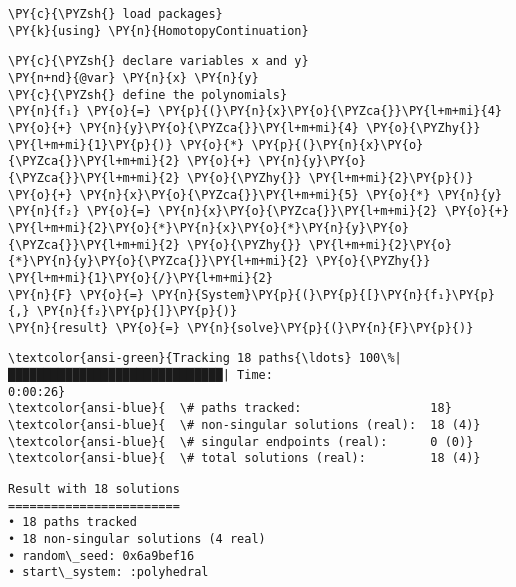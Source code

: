     \begin{tcolorbox}[breakable, size=fbox, boxrule=1pt, pad at break*=1mm,colback=cellbackground, colframe=cellborder]
\begin{Verbatim}[commandchars=\\\{\}]
\PY{c}{\PYZsh{} load packages}
\PY{k}{using} \PY{n}{HomotopyContinuation}
\end{Verbatim}
\end{tcolorbox}

    \begin{tcolorbox}[breakable, size=fbox, boxrule=1pt, pad at break*=1mm,colback=cellbackground, colframe=cellborder]
\begin{Verbatim}[commandchars=\\\{\}]
\PY{c}{\PYZsh{} declare variables x and y}
\PY{n+nd}{@var} \PY{n}{x} \PY{n}{y}
\PY{c}{\PYZsh{} define the polynomials}
\PY{n}{f₁} \PY{o}{=} \PY{p}{(}\PY{n}{x}\PY{o}{\PYZca{}}\PY{l+m+mi}{4} \PY{o}{+} \PY{n}{y}\PY{o}{\PYZca{}}\PY{l+m+mi}{4} \PY{o}{\PYZhy{}} \PY{l+m+mi}{1}\PY{p}{)} \PY{o}{*} \PY{p}{(}\PY{n}{x}\PY{o}{\PYZca{}}\PY{l+m+mi}{2} \PY{o}{+} \PY{n}{y}\PY{o}{\PYZca{}}\PY{l+m+mi}{2} \PY{o}{\PYZhy{}} \PY{l+m+mi}{2}\PY{p}{)} \PY{o}{+} \PY{n}{x}\PY{o}{\PYZca{}}\PY{l+m+mi}{5} \PY{o}{*} \PY{n}{y}
\PY{n}{f₂} \PY{o}{=} \PY{n}{x}\PY{o}{\PYZca{}}\PY{l+m+mi}{2} \PY{o}{+} \PY{l+m+mi}{2}\PY{o}{*}\PY{n}{x}\PY{o}{*}\PY{n}{y}\PY{o}{\PYZca{}}\PY{l+m+mi}{2} \PY{o}{\PYZhy{}} \PY{l+m+mi}{2}\PY{o}{*}\PY{n}{y}\PY{o}{\PYZca{}}\PY{l+m+mi}{2} \PY{o}{\PYZhy{}} \PY{l+m+mi}{1}\PY{o}{/}\PY{l+m+mi}{2}
\PY{n}{F} \PY{o}{=} \PY{n}{System}\PY{p}{(}\PY{p}{[}\PY{n}{f₁}\PY{p}{,} \PY{n}{f₂}\PY{p}{]}\PY{p}{)}
\PY{n}{result} \PY{o}{=} \PY{n}{solve}\PY{p}{(}\PY{n}{F}\PY{p}{)}
\end{Verbatim}
\end{tcolorbox}

    \begin{Verbatim}[commandchars=\\\{\}]
\textcolor{ansi-green}{Tracking 18 paths{\ldots} 100\%|██████████████████████████████| Time:
0:00:26}
\textcolor{ansi-blue}{  \# paths tracked:                  18}
\textcolor{ansi-blue}{  \# non-singular solutions (real):  18 (4)}
\textcolor{ansi-blue}{  \# singular endpoints (real):      0 (0)}
\textcolor{ansi-blue}{  \# total solutions (real):         18 (4)}
    \end{Verbatim}

            \begin{tcolorbox}[breakable, size=fbox, boxrule=.5pt, pad at break*=1mm, opacityfill=0]
\begin{Verbatim}[commandchars=\\\{\}]
Result with 18 solutions
========================
• 18 paths tracked
• 18 non-singular solutions (4 real)
• random\_seed: 0x6a9bef16
• start\_system: :polyhedral

\end{Verbatim}
\end{tcolorbox}